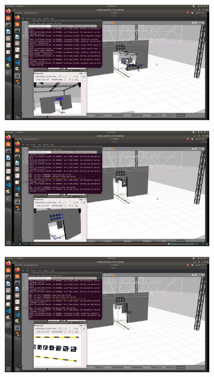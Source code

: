 \documentclass[../Head/report.tex]{subfiles}
\begin{document}
\begin{figure}[H]
\begin{subfigure}[t]{.30\textwidth}
        \caption{}
        \label{fig:gps2vision_locate_board}
    \end{subfigure}
         \hspace{0.2em}
    \begin{subfigure}[t]{.30\textwidth}
        \centering
        \includegraphics[width=\textwidth]{../Figures/GPS2Vision/drone_navigate_to_board.png}
        \caption{}
        \label{fig:gps2vision_navigate_to_board}
    \end{subfigure}
         \hspace{0.2em}
    \begin{subfigure}[t]{.30\textwidth}
        \centering
        \includegraphics[width=\textwidth]{../Figures/GPS2Vision/drone_gps2vision_transition.png}
        \caption{}
        \label{fig:gps2vision_gps2vision_transition}
    \end{subfigure}
         \hspace{0.2em}
    \begin{subfigure}[t]{.30\textwidth}
        \centering
        \includegraphics[width=\textwidth]{../Figures/GPS2Vision/drone_vision_navigation.png}

\end{subfigure}
\end{figure}
\end{document}
